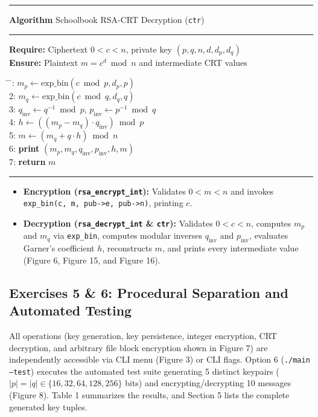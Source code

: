 \documentclass[10pt,twocolumn,letterpaper]{article}
\newcounter{algocount}
\newenvironment{labalgorithm}[1]{%
    \refstepcounter{algocount}%
    \par\vspace{0.5em}\noindent%
    \rule{\columnwidth}{0.8pt}\par\vspace{-0.4em}%
    \noindent\textbf{Algorithm \thealgocount} #1\par\vspace{-0.5em}%
    \noindent\rule{\columnwidth}{0.4pt}\par\vspace{0.2em}%
    \small\noindent%
}{%
    \par\vspace{-0.3em}\noindent\rule{\columnwidth}{0.8pt}\par\vspace{0.5em}%
}
\begin{document}
\begin{labalgorithm}{Schoolbook RSA-CRT Decryption (\texttt{ctr})}
\textbf{Require:} Ciphertext $0 < c < n$, private key $(p, q, n, d, d_p, d_q)$\\
\textbf{Ensure:} Plaintext $m = c^d \bmod n$ and intermediate CRT values
\begin{tabbing}
\hspace{1.2em} \= \hspace{1.2em} \= : $m_p \leftarrow \text{exp\_bin}(c \bmod p, d_p, p)$ \\
2: $m_q \leftarrow \text{exp\_bin}(c \bmod q, d_q, q)$ \\
3: $q_{\text{inv}} \leftarrow q^{-1} \bmod p$, \quad $p_{\text{inv}} \leftarrow p^{-1} \bmod q$ \\
4: $h \leftarrow ((m_p - m_q) \cdot q_{\text{inv}}) \bmod p$ \\
5: $m \leftarrow (m_q + q \cdot h) \bmod n$ \\
6: \textbf{print} $(m_p, m_q, q_{\text{inv}}, p_{\text{inv}}, h, m)$ \\
7: \textbf{return} $m$
\end{tabbing}
\end{labalgorithm}

\begin{itemize}
    \item \textbf{Encryption (\texttt{rsa\_encrypt\_int}):} Validates $0 < m < n$ and invokes \texttt{exp\_bin(c, m, pub->e, pub->n)}, printing $c$.
    \item \textbf{Decryption (\texttt{rsa\_decrypt\_int} \& \texttt{ctr}):} Validates $0 < c < n$, computes $m_p$ and $m_q$ via \texttt{exp\_bin}, computes modular inverses $q_{\text{inv}}$ and $p_{\text{inv}}$, evaluates Garner's coefficient $h$, reconstructs $m$, and prints every intermediate value (Figure 6, Figure 15, and Figure 16).
\end{itemize}

\subsection{Exercises 5 \& 6: Procedural Separation and Automated Testing}

All operations (key generation, key persistence, integer encryption, CRT decryption, and arbitrary file block encryption shown in Figure 7) are independently accessible via CLI menu (Figure 3) or CLI flags. Option 6 (\texttt{./main --test}) executes the automated test suite generating 5 distinct keypairs ($|p|=|q| \in \{16, 32, 64, 128, 256\}$ bits) and encrypting/decrypting 10 messages (Figure 8). Table 1 summarizes the results, and Section 5 lists the complete generated key tuples.
\end{document}
